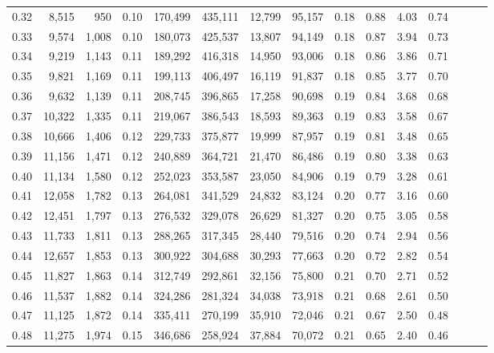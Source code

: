 \begin{tabular}{rrrrrrrrrrrrrrr}
0.32 &   8,515 &    950 &  0.10 &  170,499 &  435,111 &   12,799 &   95,157 &  0.18 &  0.88 &  4.03 &      0.74 \\
0.33 &   9,574 &  1,008 &  0.10 &  180,073 &  425,537 &   13,807 &   94,149 &  0.18 &  0.87 &  3.94 &      0.73 \\
0.34 &   9,219 &  1,143 &  0.11 &  189,292 &  416,318 &   14,950 &   93,006 &  0.18 &  0.86 &  3.86 &      0.71 \\
0.35 &   9,821 &  1,169 &  0.11 &  199,113 &  406,497 &   16,119 &   91,837 &  0.18 &  0.85 &  3.77 &      0.70 \\
0.36 &   9,632 &  1,139 &  0.11 &  208,745 &  396,865 &   17,258 &   90,698 &  0.19 &  0.84 &  3.68 &      0.68 \\
0.37 &  10,322 &  1,335 &  0.11 &  219,067 &  386,543 &   18,593 &   89,363 &  0.19 &  0.83 &  3.58 &      0.67 \\
0.38 &  10,666 &  1,406 &  0.12 &  229,733 &  375,877 &   19,999 &   87,957 &  0.19 &  0.81 &  3.48 &      0.65 \\
0.39 &  11,156 &  1,471 &  0.12 &  240,889 &  364,721 &   21,470 &   86,486 &  0.19 &  0.80 &  3.38 &      0.63 \\
0.40 &  11,134 &  1,580 &  0.12 &  252,023 &  353,587 &   23,050 &   84,906 &  0.19 &  0.79 &  3.28 &      0.61 \\
0.41 &  12,058 &  1,782 &  0.13 &  264,081 &  341,529 &   24,832 &   83,124 &  0.20 &  0.77 &  3.16 &      0.60 \\
0.42 &  12,451 &  1,797 &  0.13 &  276,532 &  329,078 &   26,629 &   81,327 &  0.20 &  0.75 &  3.05 &      0.58 \\
0.43 &  11,733 &  1,811 &  0.13 &  288,265 &  317,345 &   28,440 &   79,516 &  0.20 &  0.74 &  2.94 &      0.56 \\
0.44 &  12,657 &  1,853 &  0.13 &  300,922 &  304,688 &   30,293 &   77,663 &  0.20 &  0.72 &  2.82 &      0.54 \\
0.45 &  11,827 &  1,863 &  0.14 &  312,749 &  292,861 &   32,156 &   75,800 &  0.21 &  0.70 &  2.71 &      0.52 \\
0.46 &  11,537 &  1,882 &  0.14 &  324,286 &  281,324 &   34,038 &   73,918 &  0.21 &  0.68 &  2.61 &      0.50 \\
0.47 &  11,125 &  1,872 &  0.14 &  335,411 &  270,199 &   35,910 &   72,046 &  0.21 &  0.67 &  2.50 &      0.48 \\
0.48 &  11,275 &  1,974 &  0.15 &  346,686 &  258,924 &   37,884 &   70,072 &  0.21 &  0.65 &  2.40 &      0.46 \\

\end{tabular}
